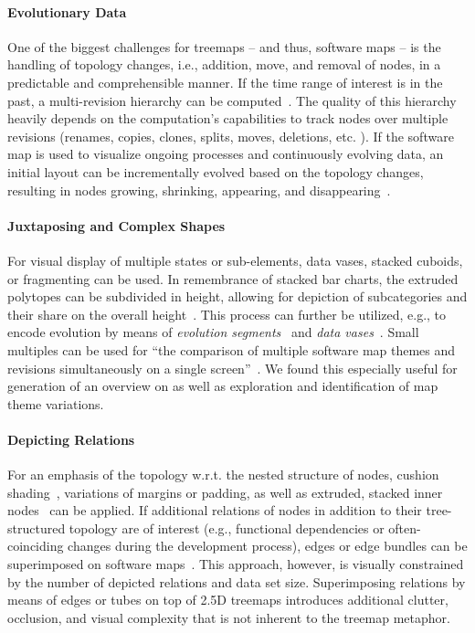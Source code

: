 \documentclass[sigconf]{acmart}
\def\eg{e.g., }
\def\ie{i.e., }
\def\wrt{w.r.t. }
\def\etc{etc. }
\begin{document}
\paragraph{Evolutionary Data}
One of the biggest challenges for treemaps -- and thus, software maps -- is the handling of topology changes, \ie addition, move, and removal of nodes, in a predictable and comprehensible manner.
If the time range of interest is in the past, a multi-revision hierarchy can be computed~\cite{tu2007-changes}.
The quality of this hierarchy heavily depends on the computation's capabilities to track nodes over multiple revisions (renames, copies, clones, splits, moves, deletions, \etc).
If the software map is used to visualize ongoing processes and continuously evolving data, an initial layout can be incrementally evolved based on the topology changes, resulting in nodes growing, shrinking, appearing, and disappearing~\cite{scheibel2018-evocells}.
\paragraph{Juxtaposing and Complex Shapes}
For visual display of multiple states or sub-elements, data vases, stacked cuboids, or fragmenting can be used.
In remembrance of stacked bar charts, the extruded polytopes can be subdivided in height, allowing for depiction of subcategories and their share on the overall height~\cite{itoh2006-networkintrusion,giereth2008-patentportfolios}.
This process can further be utilized, \eg to encode evolution by means of \emph{evolution segments}~\cite{steinbruckner2013-evolution} and \emph{data vases}~\cite{thakur2009-datavases}.
Small multiples can be used for \enquote{the comparison of multiple software map themes and revisions simultaneously on a single screen}~\cite{scheibel2016-smallmultiples}.
We found this especially useful for generation of an overview on as well as exploration and identification of map theme variations.
\paragraph{Depicting Relations}
For an emphasis of the topology \wrt the nested structure of nodes, cushion shading~\cite{vanwijk1999-cushion}, variations of margins or padding, as well as extruded, stacked inner nodes~\cite{bladh2004-threedimensions} can be applied.
If additional relations of nodes in addition to their tree-structured topology are of interest (\eg functional dependencies or often-coinciding changes during the development process), edges or edge bundles can be superimposed on software maps~\cite{holten2006-edgebundles,steinbeck2019-evostreets}.
This approach, however, is visually constrained by the number of depicted relations and data set size.
Superimposing relations by means of edges or tubes on top of 2.5D treemaps introduces additional clutter, occlusion, and visual complexity that is not inherent to the treemap metaphor.
\end{document}
